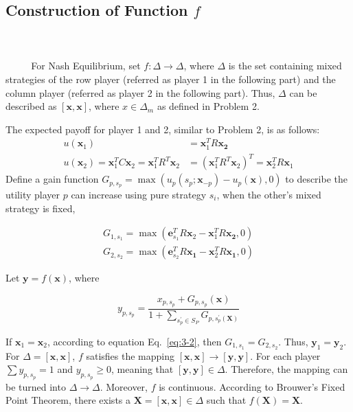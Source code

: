 \documentclass[oneside,solution]{seu-ml-assign}
\begin{document}
\subsection{Construction of Function $f$}
\\ \hspace*{\fill} \\
$\text{        }\quad\text{  }$
For Nash Equilibrium, set \(f:\Delta\rightarrow\Delta\), where
\(\Delta\) is the set containing mixed strategies of the row player
(referred as player 1 in the following part) and the column player
(referred as player 2 in the following part). Thus, \(\Delta\) can be
described as \([\mathbf{x},\mathbf{x}]\), where \(x\in\Delta_m\) as
defined in Problem 2.

The expected payoff for player 1 and 2, similar to Problem 2, is as
follows:
\begin{equation}
\begin{aligned}
u(\mathbf{x}_1)&=\mathbf{x}_1^TR\mathbf{x_2}\\
u(\mathbf{x}_2)=\mathbf{x}_1^TC\mathbf{x}_2=\mathbf{x}_1^TR^T\mathbf{x}_2&=(\mathbf{x}_1^TR^T\mathbf{x}_2)^T=\mathbf{x}_2^TR\mathbf{x}_1
\end{aligned}
\end{equation}
Define a gain function
\(G_{p,s_p}=\max(u_p(s_p;\mathbf{x}_{-p})-u_p(\mathbf{x}),0)\) to
describe the utility player \(p\) can increase using pure strategy
\(s_i\), when the other's mixed strategy is fixed,

\begin{equation}
\begin{aligned}
G_{1,s_1}=\max(\mathbf{e}_{s_1}^TR\mathbf{x}_2-\mathbf{x}_1^TR\mathbf{x_2},0)\\
G_{2,s_2}=\max(\mathbf{e}_{s_2}^TR\mathbf{x_1}-\mathbf{x}_2^TR\mathbf{x_1},0)
\end{aligned}
\label{eq:3-2}
\end{equation}

Let \(\mathbf{y}=f(\mathbf{x})\), where

\begin{equation}
    y_{p,s_p}=\frac{x_{p,s_p}+G_{p,s_p}(\mathbf{x})}{1+\sum_{s^{'}_p\in S_P}G_{p,s^{'}_p(\mathbf{X})}}
\end{equation}

If \(\mathbf{x}_1=\mathbf{x}_2\), according to equation Eq.~\eqref{eq:3-2}, then
\(G_{1,s_1}=G_{2,s_2}\). Thus, \(\mathbf{y}_1=\mathbf{y}_2\). For
\(\Delta=[\mathbf{x},\mathbf{x}]\), \(f\) satisfies the mapping
\([\mathbf{x},\mathbf{x}]\rightarrow[\mathbf{y},\mathbf{y}]\). For each
player \(\sum y_{p,s_p} =1\) and \(y_{p,s_p}\geq 0\), meaning that
\([\mathbf{y},\mathbf{y}]\in \Delta\). Therefore, the mapping can be
turned into \(\Delta \rightarrow \Delta\). Moreover, \(f\) is
continuous. According to Brouwer's Fixed Point Theorem, there exists a
\(\mathbf{X}=[\mathbf{x},\mathbf{x}] \in \Delta\) such that
\(f(\mathbf{\mathbf{X}})=\mathbf{X}\).
\end{document}
